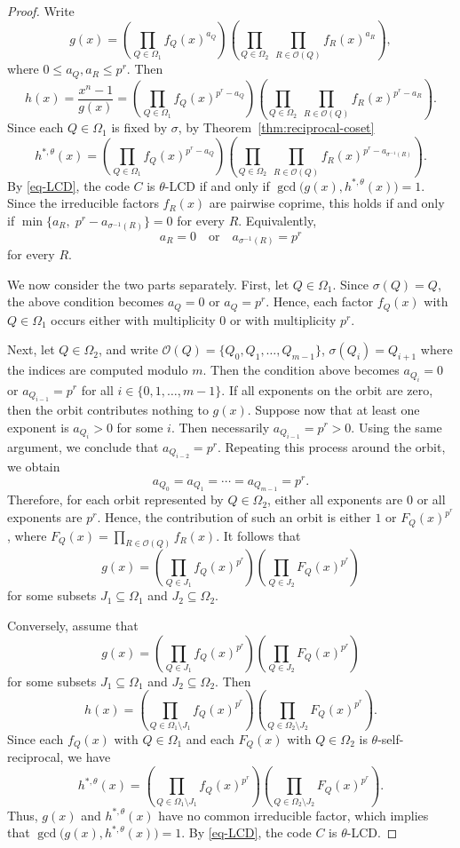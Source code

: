\documentclass[pdflatex,sn-mathphys-num]{sn-jnl}%
\theoremstyle{thmstyleone}%
\theoremstyle{thmstyletwo}%
\theoremstyle{thmstylethree}%
\begin{document}
\begin{proof}
Write
\[
g(x)=
\left(\prod_{Q\in \Omega_1} f_Q(x)^{a_Q}\right)
\left(\prod_{Q\in \Omega_2}\ \prod_{R\in \mathcal O(Q)} f_R(x)^{a_R}\right),
\]
where $0\le a_Q,a_R\le p^r$.
Then
\[
h(x)=\frac{x^n-1}{g(x)}
=
\left(\prod_{Q\in \Omega_1} f_Q(x)^{p^r-a_Q}\right)
\left(\prod_{Q\in \Omega_2}\ \prod_{R\in \mathcal O(Q)} f_R(x)^{p^r-a_R}\right).
\]
Since each $Q\in \Omega_1$ is fixed by $\sigma$,  by Theorem~\ref{thm:reciprocal-coset}
\[
h^{\ast,\theta}(x)=
\left(\prod_{Q\in \Omega_1} f_Q(x)^{p^r-a_Q}\right)
\left(\prod_{Q\in \Omega_2}\ \prod_{R\in \mathcal O(Q)} f_R(x)^{p^r-a_{\sigma^{-1}(R)}}\right).
\]
By \eqref{eq-LCD}, the code $C$ is $\theta$-LCD if and only if
$
\gcd\bigl(g(x),h^{\ast,\theta}(x)\bigr)=1$.
Since the irreducible factors $f_R(x)$ are pairwise coprime, this holds if and only if
$
\min\{a_R,\;p^r-a_{\sigma^{-1}(R)}\}=0$ for every $R$.
Equivalently,
\[
a_R=0
\quad\text{or}\quad
a_{\sigma^{-1}(R)}=p^r
\]
for every $R$.

We now consider the two parts separately.
First, let $Q\in \Omega_1$. Since $\sigma(Q)=Q$, the above condition becomes
$
a_Q=0 \text{ or }
a_Q=p^r$.
Hence, each factor $f_Q(x)$ with $Q\in \Omega_1$ occurs either with multiplicity $0$ or with multiplicity $p^r$.

Next, let $Q\in \Omega_2$, and write
$
\mathcal O(Q)=\{Q_0,Q_1,\dots,Q_{m-1}\}
$,  $ \sigma(Q_i)=Q_{i+1}$
 where the indices are computed modulo $m$.
Then the condition above becomes
$
a_{Q_i}=0 $ or $
a_{Q_{i-1}}=p^r$ 
 for all $i\in \{0,1,\dots, m-1\}$.
If all exponents on the orbit are zero, then the orbit contributes nothing to $g(x)$. Suppose now that at least one exponent is $
a_{Q_i}>0$
for some $i$. Then necessarily
$
a_{Q_{i-1}}=p^r>0$. Using the same argument, we conclude that $
a_{Q_{i-2}}=p^r$.
Repeating this process around the orbit, we obtain
\[
a_{Q_0}=a_{Q_1}=\cdots=a_{Q_{m-1}}=p^r.
\]
Therefore, for each orbit represented by $Q\in \Omega_2$, either all exponents are $0$ or all exponents are $p^r$. Hence, the contribution of such an orbit is either $1$ or
$
F_Q(x)^{p^r}$, where 
$F_Q(x)=\prod_{R\in \mathcal O(Q)} f_R(x)$.
It follows that
\[
g(x)=
\left(\prod_{Q\in J_1} f_Q(x)^{p^r}\right)
\left(\prod_{Q\in J_2} F_Q(x)^{p^r}\right)
\]
for some subsets $J_1\subseteq \Omega_1$ and $J_2\subseteq \Omega_2$.

Conversely, assume that
\[
g(x)=
\left(\prod_{Q\in J_1} f_Q(x)^{p^r}\right)
\left(\prod_{Q\in J_2} F_Q(x)^{p^r}\right)
\]
for some subsets $J_1\subseteq \Omega_1$ and $J_2\subseteq \Omega_2$. Then
\[
h(x)=
\left(\prod_{Q\in \Omega_1\setminus J_1} f_Q(x)^{p^r}\right)
\left(\prod_{Q\in \Omega_2\setminus J_2} F_Q(x)^{p^r}\right).
\]
Since each $f_Q(x)$ with $Q\in\Omega_1$ and each $F_Q(x)$ with $Q\in\Omega_2$ is $\theta$-self-reciprocal, we have
\[
h^{\ast,\theta}(x)=
\left(\prod_{Q\in \Omega_1\setminus J_1} f_Q(x)^{p^r}\right)
\left(\prod_{Q\in \Omega_2\setminus J_2} F_Q(x)^{p^r}\right).
\]
Thus, $g(x)$ and $h^{\ast,\theta}(x)$ have no common irreducible factor, which implies that $
\gcd\bigl(g(x),h^{\ast,\theta}(x)\bigr)=1$.
By \eqref{eq-LCD}, the code $C$ is $\theta$-LCD.


\end{proof}
\end{document}
